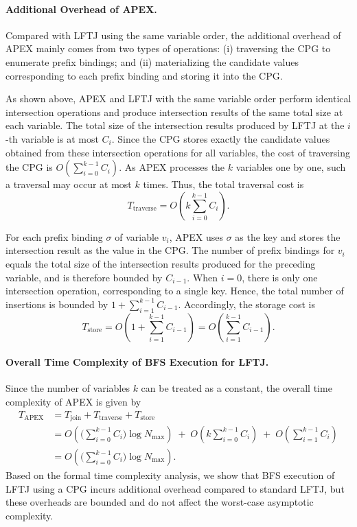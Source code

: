 \documentclass[11pt]{article}
\begin{document}
\paragraph{\textbf{Additional Overhead of APEX.}}
Compared with LFTJ using the same variable order, the additional overhead of APEX mainly comes from two types of operations: (i) traversing the CPG to enumerate prefix bindings; and (ii) materializing the candidate values corresponding to each prefix binding and storing it into the CPG.

As shown above, APEX and LFTJ with the same variable order perform identical intersection operations and produce intersection results of the same total size at each variable. 
The total size of the intersection results produced by LFTJ at the $i$-th variable is at most $C_i$. 
Since the CPG stores exactly the candidate values obtained from these intersection operations for all variables, the cost of traversing the CPG is $O(\sum_{i=0}^{k-1} C_i).$
As APEX processes the $k$ variables one by one, such a traversal may occur at most $k$ times. Thus, the total traversal cost is
$$
T_{\text{traverse}}
= O\!\left(k\sum_{i=0}^{k-1} C_i\right).
$$

For each prefix binding $\sigma$ of variable $v_i$, APEX uses $\sigma$ as the key and stores the intersection result as the value in the CPG. 
The number of prefix bindings for $v_i$ equals the total size of the intersection results produced for the preceding variable, and is therefore bounded by $C_{i-1}$. When $i=0$, there is only one intersection operation, corresponding to a single key. Hence, the total number of insertions is bounded by $1 + \sum_{i=1}^{k-1} C_{i-1}.$
Accordingly, the storage cost is
$$
T_{\text{store}}
= O\!\left(1 + \sum_{i=1}^{k-1} C_{i-1}\right)
= O\!\left(\sum_{i=1}^{k-1} C_{i-1}\right).
$$

\paragraph{\textbf{Overall Time Complexity of BFS Execution for LFTJ.}}
Since the number of variables $k$ can be treated as a constant, the overall time complexity of APEX is given by
$$
\begin{aligned}
T_{\text{APEX}}
&= T_{\text{join}} + T_{\text{traverse}} + T_{\text{store}} \\
&= O\!\left(\Big(\sum_{i=0}^{k-1} C_i\Big)\log N_{\max}\right)
\;+\; O\!\left(k\sum_{i=0}^{k-1} C_i\right)
\;+\; O\!\left(\sum_{i=1}^{k-1} C_i\right) \\
&= O\!\left(\Big(\sum_{i=0}^{k-1} C_i\Big)\log N_{\max}\right).
\end{aligned}
$$
Based on the formal time complexity analysis, we show that BFS execution of LFTJ using a CPG incurs additional overhead compared to standard LFTJ, but these overheads are bounded and do not affect the worst-case asymptotic complexity. 
\end{document}
